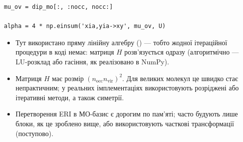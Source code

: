 \documentclass{PySCFBook}
\begin{document}
\begin{verbatim}
mu_ov = dip_mo[:, :nocc, nocc:]

alpha = 4 * np.einsum('xia,yia->xy', mu_ov, U)
\end{verbatim}

\begin{commentbox}
\begin{itemize}
   \item  Тут використано пряму лінійну алгебру () --- тобто жодної ітераційної процедури в коді немає: матриця \(H\) розв'язується одразу (алгоритмічно --- LU-розклад або гасіння, як реалізовано в NumPy).
  \item Матриця \(H\) має розмір \((n_\text{occ} n_\text{vir})^2\). Для великих молекул це швидко стає непрактичним; у реальних імплементаціях використовують розріджені або ітеративні методи, а також симетрії.
  \item Перетворення ERI в МО-базис є дорогим по пам'яті; часто будують лише блоки, як це зроблено вище, або використовують часткові трансформації (поступово).
\end{itemize}
\end{commentbox}



%
%
%
%
%
%
\end{document}
